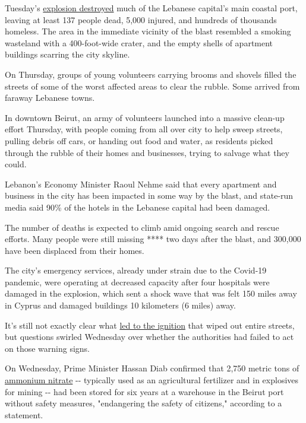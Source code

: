 Tuesday's
\href{https://edition.cnn.com/interactive/2020/08/middleeast/beirut-visual-guide/index.html}{explosion
destroyed} much of the Lebanese capital's main coastal port, leaving at
least 137 people dead, 5,000 injured, and hundreds of thousands
homeless. The area in the immediate vicinity of the blast resembled a
smoking wasteland with a 400-foot-wide crater, and the empty shells of
apartment buildings scarring the city skyline.

On Thursday, groups of young volunteers carrying brooms and shovels
filled the streets of some of the worst affected areas to clear the
rubble. Some arrived from faraway Lebanese towns.

In downtown Beirut, an army of volunteers launched into a massive
clean-up effort Thursday, with people coming from all over city to help
sweep streets, pulling debris off cars, or handing out food and water,
as residents picked through the rubble of their homes and businesses,
trying to salvage what they could.

Lebanon's Economy Minister Raoul Nehme said that every apartment and
business in the city has been impacted in some way by the blast, and
state-run media said 90\% of the hotels in the Lebanese capital had been
damaged.

The number of deaths is expected to climb amid ongoing search and rescue
efforts. Many people were still missing **** two days after the blast,
and 300,000 have been displaced from their homes.

The city's emergency services, already under strain due to the Covid-19
pandemic, were operating at decreased capacity after four hospitals were
damaged in the explosion, which sent a shock wave that was felt 150
miles away in Cyprus and damaged buildings 10 kilometers (6 miles) away.

It's still not exactly clear what
\href{https://www.cnn.com/2020/08/04/middleeast/wedeman-beirut-explosion-intl-hnk/index.html}{led
to the ignition} that wiped out entire streets, but questions swirled
Wednesday over whether the authorities had failed to act on those
warning signs.

On Wednesday, Prime Minister Hassan Diab confirmed that 2,750 metric
tons of
\href{https://edition.cnn.com/2020/08/05/middleeast/ammonium-nitrate-beirut-blast-intl/index.html}{ammonium
nitrate} -\/- typically used as an agricultural fertilizer and in
explosives for mining -\/- had been stored for six years at a warehouse
in the Beirut port without safety measures, "endangering the safety of
citizens," according to a statement.

